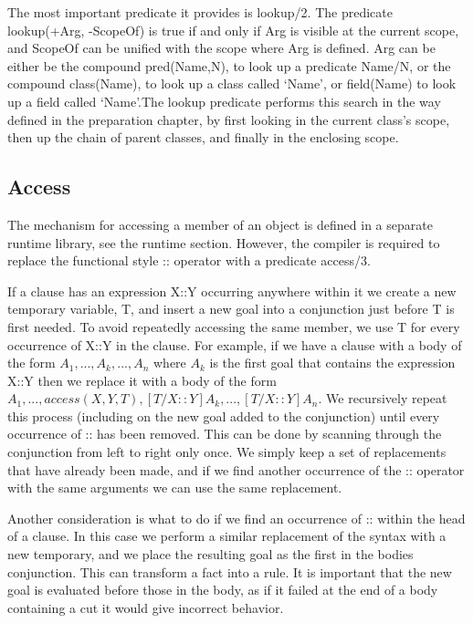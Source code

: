 \documentclass[12pt,a4paper,twoside,openright]{report}
\begin{document}
\bigskip

The most important predicate it provides is lookup/2. The predicate lookup(+Arg, -ScopeOf) is true if and only if Arg is visible at the current scope, and ScopeOf can be unified with the scope where Arg is defined. Arg can be either be the compound pred(Name,N), to look up a predicate Name/N, or the compound class(Name), to look up a class called `Name', or field(Name) to look up a field called `Name'.The lookup predicate performs this search in the way defined in the preparation chapter, by first looking in the current class's scope, then up the chain of parent classes, and finally in the enclosing scope.

\subsection{Access}

The mechanism for accessing a member of an object is defined in a separate runtime library, see the runtime section. However, the compiler is required to replace the functional style :: operator with a predicate access/3. 

\bigskip

If a clause has an expression X::Y occurring anywhere within it we create a new temporary variable, T, and insert a new goal into a conjunction just before T is first needed. To avoid repeatedly accessing the same member, we use T for every occurrence of X::Y in the clause. For example, if we have a clause with a body of the form $A_1, ..., A_k, ..., A_n$ where $A_k$ is the first goal that contains the expression X::Y then we replace it with a body of the form $A_1, ..., access(X, Y, T), [T/X::Y]A_k, ..., [T/X::Y]A_n$. We recursively repeat this process (including on the new goal added to the conjunction) until every occurrence of :: has been removed. This can be done by scanning through the conjunction from left to right only once. We simply keep a set of  replacements that have already been made, and if we find another occurrence of the :: operator with the same arguments we can use the same replacement.

\bigskip

Another consideration is what to do if we find an occurrence of :: within the head of a clause. In this case we perform a similar replacement of the syntax with a new temporary, and we place the resulting goal as the first in the bodies conjunction. This can transform a fact into a rule. It is important that the new goal is evaluated before those in the body, as if it failed at the end of a body containing a cut it would give incorrect behavior.
\end{document}

